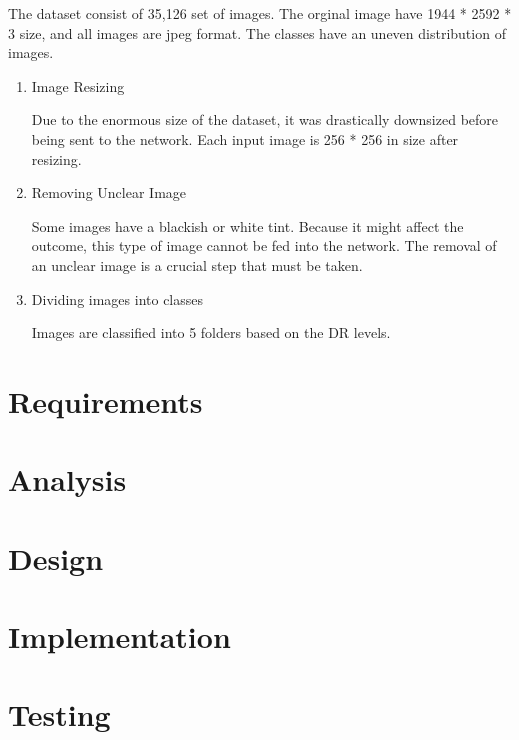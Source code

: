 \documentclass[
]{article}
\begin{document}
The dataset consist of 35,126 set of images. The orginal image have 1944
* 2592 * 3 size, and all images are jpeg format. The classes have an
uneven distribution of images.

\pagebreak

\begin{enumerate}
\def\labelenumi{\arabic{enumi}.}
\item
  Image Resizing

  Due to the enormous size of the dataset, it was drastically downsized
  before being sent to the network. Each input image is 256 * 256 in
  size after resizing.
\item
  Removing Unclear Image

  Some images have a blackish or white tint. Because it might affect the
  outcome, this type of image cannot be fed into the network. The
  removal of an unclear image is a crucial step that must be taken.
\item
  Dividing images into classes

  Images are classified into 5 folders based on the DR levels.
\end{enumerate}

\pagebreak

\hypertarget{requirements}{%
\section{Requirements}\label{requirements}}

\hypertarget{analysis}{%
\section{Analysis}\label{analysis}}

\hypertarget{design}{%
\section{Design}\label{design}}

\hypertarget{implementation}{%
\section{Implementation}\label{implementation}}

\hypertarget{testing}{%
\section{Testing}\label{testing}}
\end{document}
